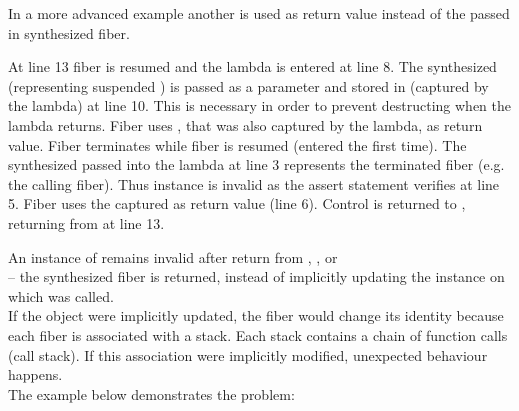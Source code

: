 In a more advanced example another \fiber is used as return value instead of the
passed in synthesized fiber.

At line 13 fiber  is resumed and the lambda is entered at line 8. The
synthesized \fiber\xspace {} (representing suspended \main) is passed as a
parameter  and stored in  (captured by the lambda) at line 10.
This is necessary in order to prevent destructing  when the lambda
returns. Fiber  uses , that was also captured by the lambda, as
return value. Fiber  terminates while fiber  is resumed (entered
the first time). The synthesized \fiber\xspace {} passed into the lambda at line 3
represents the terminated fiber  (e.g. the calling fiber). Thus instance
 is invalid as the assert statement verifies at line 5. Fiber  uses
the captured \fiber\xspace {} as return value (line 6). Control is returned to
\main, returning from  at line 13.\\


\label{fiberreturn}
An instance of \fiber remains invalid after return from \resume, \resumewith,
\xtresume or\\
\xtresumewith -- the synthesized fiber is returned, instead of
implicitly updating the \fiber instance on which \resume was called.\\
If the \fiber object were implicitly updated, the fiber would 
change its identity because each fiber is associated with a stack. Each stack
contains a chain of function calls (call stack). If this association were
implicitly modified, unexpected behaviour happens.\\
The example below demonstrates the problem:


